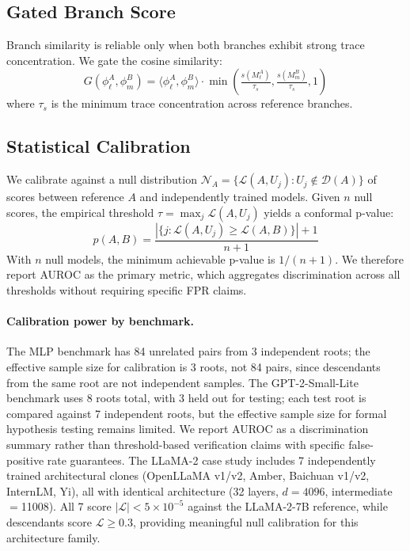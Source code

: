 \subsection{Gated Branch Score}

Branch similarity is reliable only when both branches exhibit strong trace concentration. We gate the cosine similarity:
\begin{equation}
G(\phi^A_\ell, \phi^B_m) = \langle \phi^A_\ell, \phi^B_m \rangle \cdot \min\!\left(\tfrac{s(M^A_\ell)}{\tau_s}, \tfrac{s(M^B_m)}{\tau_s}, 1\right)
\end{equation}
where $\tau_s$ is the minimum trace concentration across reference branches.

\subsection{Statistical Calibration}

We calibrate against a null distribution $\mathcal{N}_A = \{\mathcal{L}(A, U_j) : U_j \notin \mathcal{D}(A)\}$ of scores between reference $A$ and independently trained models. Given $n$ null scores, the empirical threshold $\tau = \max_j \mathcal{L}(A, U_j)$ yields a conformal p-value:
\begin{equation}
p(A,B) = \frac{|\{j : \mathcal{L}(A, U_j) \geq \mathcal{L}(A,B)\}| + 1}{n + 1}
\end{equation}
With $n$ null models, the minimum achievable p-value is $1/(n+1)$. We therefore report AUROC as the primary metric, which aggregates discrimination across all thresholds without requiring specific FPR claims.

\paragraph{Calibration power by benchmark.} The MLP benchmark has 84 unrelated pairs from 3 independent roots; the effective sample size for calibration is 3 roots, not 84 pairs, since descendants from the same root are not independent samples. The GPT-2-Small-Lite benchmark uses 8 roots total, with 3 held out for testing; each test root is compared against 7 independent roots, but the effective sample size for formal hypothesis testing remains limited. We report AUROC as a discrimination summary rather than threshold-based verification claims with specific false-positive rate guarantees. The LLaMA-2 case study includes 7 independently trained architectural clones (OpenLLaMA v1/v2, Amber, Baichuan v1/v2, InternLM, Yi), all with identical architecture (32 layers, $d{=}4096$, intermediate$=$11008). All 7 score $|\mathcal{L}| < 5 \times 10^{-5}$ against the LLaMA-2-7B reference, while descendants score $\mathcal{L} \geq 0.3$, providing meaningful null calibration for this architecture family.

